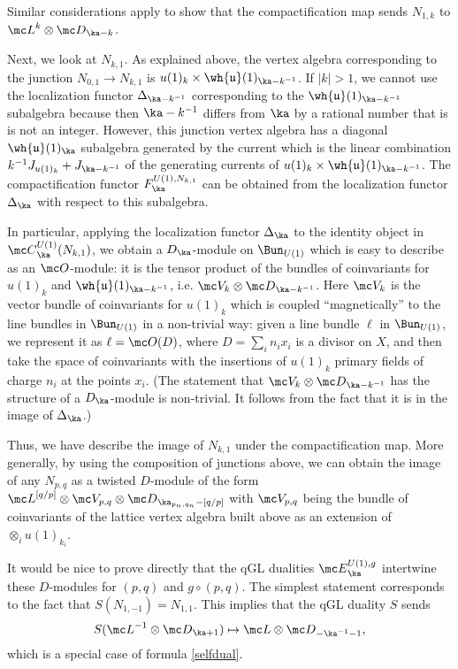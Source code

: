 \documentclass[11pt,reqno]{amsart}
\theoremstyle{plain}
\numberwithin{equation}{section}
\theoremstyle{definition}
\begin{document}
Similar considerations apply to show that the compactification map
sends $N_{1,k}$ to ${\mc L}^k \otimes {\mc D}_{\ka-k}$.

\medskip

Next, we look at $N_{k,1}$. As explained above, the vertex algebra
corresponding to the junction $N_{0,1} \to N_{k,1}$ is $u(1)_k \times
\wh{\mathfrak{u}}(1)_{\ka - k^{-1}}$. If $|k|>1$, we cannot use the
localization functor $\Delta_{\ka - k^{-1}}$ corresponding to the
$\wh{\mathfrak{u}}(1)_{\ka - k^{-1}}$ subalgebra because then $\ka -
k^{-1}$ differs from $\ka$ by a rational number that is is not an
integer. However, this junction vertex algebra has a diagonal
$\wh{\mathfrak{u}}(1)_\ka$ subalgebra generated by the current which
is the linear combination $k^{-1} J_{u(1)_k} + J_{\ka - k^{-1}}$ of
the generating currents of $u(1)_k \times \wh{\mathfrak{u}}(1)_{\ka -
  k^{-1}}$. The compactification functor $F^{U(1),N_{k,1}}_\ka$ can be
obtained from the localization functor $\Delta_\ka$ with
respect to this subalgebra.

In particular, applying the localization functor $\Delta_\ka$ to the
identity object in ${\mc C}^{U(1)}_\ka(N_{k,1})$, we obtain a
$D_\ka$-module on $\Bun_{U(1)}$ which is easy to describe as an ${\mc
  O}$-module: it is the tensor product of the bundles of coinvariants
for $u(1)_k$ and $\wh{\mathfrak{u}}(1)_{\ka - k^{-1}}$, i.e. ${\mc
  V_k} \otimes {\mc D}_{\ka-k^{-1}}$. Here ${\mc V_k}$ is the vector
bundle of coinvariants for $u(1)_k$ which is coupled ``magnetically''
to the line bundles in $\Bun_{U(1)}$ in a non-trivial way: given a
line bundle $\ell$ in $\Bun_{U(1)}$, we represent it as $\ell = {\mc
  O}(D)$, where $D = \sum_i n_i x_i$ is a divisor on $X$, and then
take the space of coinvariants with the insertions of $u(1)_k$ primary
fields of charge $n_i$ at the points $x_i$. (The statement that ${\mc
  V_k} \otimes {\mc D}_{\ka-k^{-1}}$ has the structure of a
$D_\ka$-module is non-trivial. It follows from the fact that it is in
the image of $\Delta_\ka$.)

Thus, we have describe the image of $N_{k,1}$ under the
compactification map. More generally, by using the composition of
junctions above, we can obtain the image of any $N_{p,q}$ as a twisted
$D$-module of the form ${\mc L}^{[q/p]} \otimes {\mc V_{p,q}}
\otimes {\mc D}_{\ka_{p_n,q_n}-[q/p]}$ with ${\mc V_{p,q}}$ being
the bundle of coinvariants of the lattice vertex
algebra built above as an extension of $\otimes_i u(1)_{k_i}$.

It would be nice to prove directly that the qGL dualities ${\mc
  E}^{U(1),g}_\ka$ intertwine these $D$-modules for $(p,q)$ and $g \circ
(p,q)$. The simplest statement corresponds to the fact that
$S(N_{1,-1}) = N_{1,1}$. This implies that the qGL duality $S$ sends
$$
S({\mc L}^{-1} \otimes {\mc D}_{\ka+1}) \mapsto {\mc L} \otimes {\mc
  D}_{-\ka^{-1}-1},
$$
which is a special case of formula \eqref{selfdual}.
\end{document}

